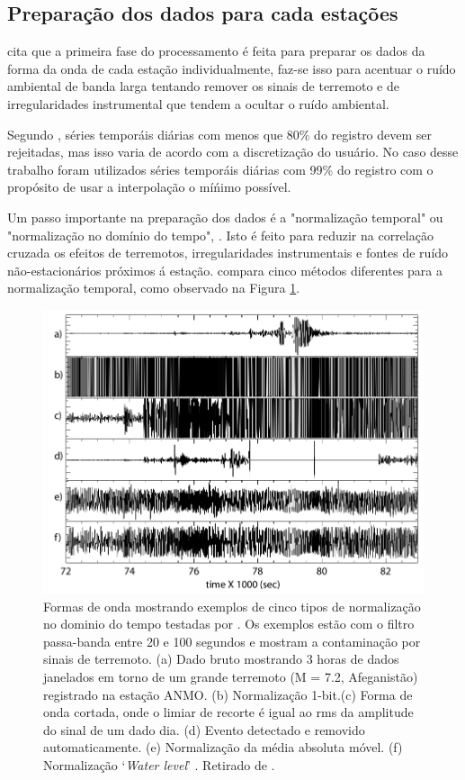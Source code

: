 \subsection{Preparação dos dados para cada estações}

\cite{bensen_processing_2007} cita que a primeira fase do processamento  é feita para preparar os dados da forma da onda de cada estação individualmente, faz-se isso para acentuar o ruído ambiental de banda larga tentando remover os sinais de terremoto e de irregularidades instrumental que tendem a ocultar o ruído ambiental.

Segundo \cite{bensen_processing_2007}, séries temporáis diárias com menos que 80\% do registro devem ser rejeitadas, mas isso varia de acordo com a discretização do usuário. No caso desse trabalho foram utilizados séries  temporáis diárias com 99\% do registro com o propósito de usar a interpolação o míńimo possível.

Um passo importante na preparação dos dados é a "normalização temporal" ou "normalização no domínio do tempo", \cite{bensen_processing_2007}. Isto é feito para reduzir na correlação cruzada os efeitos de terremotos, irregularidades instrumentais e fontes de ruído não-estacionários próximos á estação. \cite{bensen_processing_2007} compara cinco métodos diferentes para a normalização temporal, como observado na Figura \ref{temporal_norma}.

\begin{figure}[!ht]
\centering
\includegraphics[scale=0.55]{temporal_norma.png}
\caption{Formas de onda mostrando exemplos de cinco tipos de normalização no dominio do tempo testadas por \cite{bensen_processing_2007}. Os exemplos estão com o filtro passa-banda entre 20 e 100 segundos e mostram a contaminação por sinais de terremoto. (a)  Dado bruto mostrando 3 horas de dados janelados em torno de um grande terremoto (M = 7.2, Afeganistão) registrado na estação ANMO. (b) Normalização 1-bit.(c) Forma de onda cortada, onde o limiar de recorte é igual ao rms da amplitude do sinal de um dado dia. (d) Evento detectado e removido automaticamente. (e) Normalização da média absoluta móvel. (f) Normalização ‘\textit{Water level}’ . Retirado de \cite{bensen_processing_2007}.}
\label{temporal_norma}
\end{figure} 


